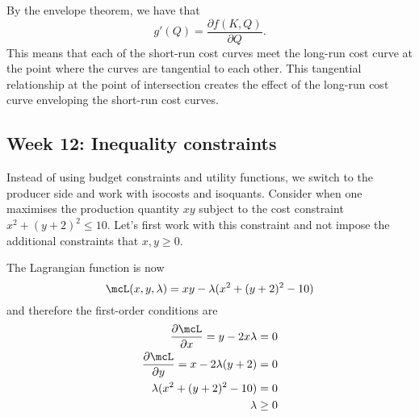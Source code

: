 \documentclass[a4paper, 12pt,oneside,openany]{book}
\begin{document}
By the envelope theorem, we have that $$g'(Q)=\frac{\partial f(K, Q)}{\partial Q}.$$ This means that each of the short-run cost curves meet the long-run cost curve at the point where the curves are tangential to each other. This tangential relationship at the point of intersection creates the effect of the long-run cost curve enveloping the short-run cost curves.



\subsection{Week 12: Inequality constraints}

Instead of using budget constraints and utility functions, we switch to the producer side and work with isocosts and isoquants. Consider when one maximises the production quantity $xy$ subject to the cost constraint $x^2+(y+2)^2 \leq 10.$ Let's first work with this constraint and not impose the additional constraints that $x, y\geq0$. 

The Lagrangian function is now $$\mcL(x, y, \lambda) = xy - \lambda (x^2+(y+2)^2-10)$$ and therefore the first-order conditions are \begin{align*} \frac{\partial \mcL}{\partial x} = y -2x\lambda&=0 \\ \frac{\partial \mcL}{\partial y} = x-2\lambda(y+2)&=0 \\ \lambda (x^2+(y+2)^2-10)&=0 \\ \lambda &\geq0 \end{align*}
\end{document}
